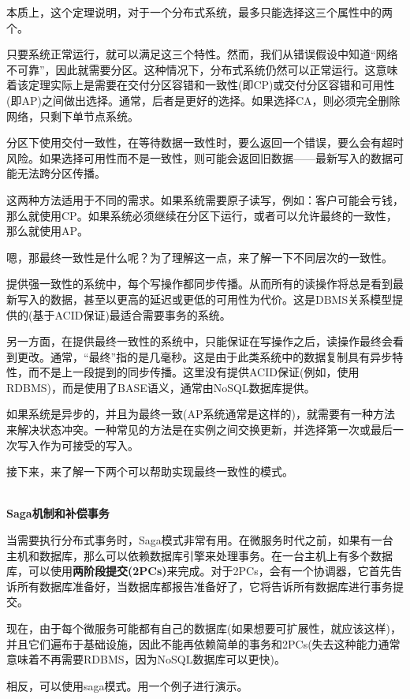 本质上，这个定理说明，对于一个分布式系统，最多只能选择这三个属性中的两个。

只要系统正常运行，就可以满足这三个特性。然而，我们从错误假设中知道“网络不可靠”，因此就需要分区。这种情况下，分布式系统仍然可以正常运行。这意味着该定理实际上是需要在交付分区容错和一致性(即CP)或交付分区容错和可用性(即AP)之间做出选择。通常，后者是更好的选择。如果选择CA，则必须完全删除网络，只剩下单节点系统。

分区下使用交付一致性，在等待数据一致性时，要么返回一个错误，要么会有超时风险。如果选择可用性而不是一致性，则可能会返回旧数据——最新写入的数据可能无法跨分区传播。

这两种方法适用于不同的需求。如果系统需要原子读写，例如：客户可能会亏钱，那么就使用CP。如果系统必须继续在分区下运行，或者可以允许最终的一致性，那么就使用AP。

嗯，那最终一致性是什么呢？为了理解这一点，来了解一下不同层次的一致性。

提供强一致性的系统中，每个写操作都同步传播。从而所有的读操作将总是看到最新写入的数据，甚至以更高的延迟或更低的可用性为代价。这是DBMS关系模型提供的(基于ACID保证)最适合需要事务的系统。

另一方面，在提供最终一致性的系统中，只能保证在写操作之后，读操作最终会看到更改。通常，“最终”指的是几毫秒。这是由于此类系统中的数据复制具有异步特性，而不是上一段提到的同步传播。这里没有提供ACID保证(例如，使用RDBMS)，而是使用了BASE语义，通常由NoSQL数据库提供。

如果系统是异步的，并且为最终一致(AP系统通常是这样的)，就需要有一种方法来解决状态冲突。一种常见的方法是在实例之间交换更新，并选择第一次或最后一次写入作为可接受的写入。

接下来，来了解一下两个可以帮助实现最终一致性的模式。

\hspace*{\fill} \\ %
\noindent
\textbf{Saga机制和补偿事务}

当需要执行分布式事务时，Saga模式非常有用。在微服务时代之前，如果有一台主机和数据库，那么可以依赖数据库引擎来处理事务。在一台主机上有多个数据库，可以使用\textbf{两阶段提交(2PCs)}来完成。对于2PCs，会有一个协调器，它首先告诉所有数据库准备好，当数据库都报告准备好了，它将告诉所有数据库进行事务提交。

现在，由于每个微服务可能都有自己的数据库(如果想要可扩展性，就应该这样)，并且它们遍布于基础设施，因此不能再依赖简单的事务和2PCs(失去这种能力通常意味着不再需要RDBMS，因为NoSQL数据库可以更快)。

相反，可以使用saga模式。用一个例子进行演示。

